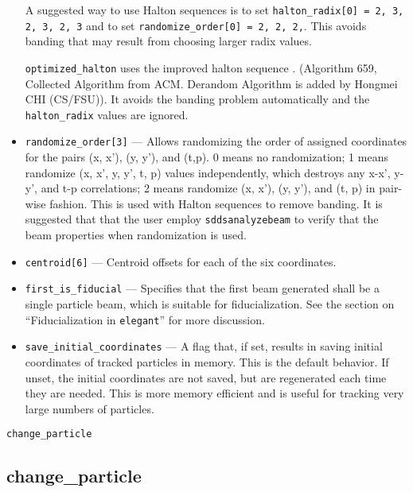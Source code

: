 \documentclass[11pt]{article}
\begin{document}
\begin{itemize}
A suggested way to use Halton sequences is to set
\verb|halton_radix[0] = 2, 3, 2, 3, 2, 3| and
to set 
\verb|randomize_order[0] = 2, 2, 2,|.  This avoids banding that may
result from choosing larger radix values.

\verb|optimized_halton| uses the improved halton sequence \cite{Chi2005}.
(Algorithm 659, Collected Algorithm from ACM. Derandom Algorithm is added
by Hongmei CHI (CS/FSU)). It avoids the banding problem automatically and
the \verb|halton_radix| values are ignored.

\item \verb|randomize_order[3]| --- Allows randomizing the order of
assigned coordinates for the pairs (x, x'), (y, y'), and (t,p).  0
means no randomization; 1 means randomize (x, x', y, y', t, p) values
independently, which destroys any x-x', y-y', and t-p correlations; 2
means randomize (x, x'), (y, y'), and (t, p) in pair-wise fashion.
This is used with Halton sequences to remove banding.  It is suggested
that that the user employ \verb|sddsanalyzebeam| to verify that the
beam properties when randomization is used.

\item \verb|centroid[6]| --- Centroid offsets for each of the six coordinates.

\item \verb|first_is_fiducial| --- Specifies that the first beam
generated shall be a single particle beam, which is suitable for
fiducialization.  See the section on ``Fiducialization in
\verb|elegant|'' for more discussion.

\item \verb|save_initial_coordinates| --- A flag that, if set, results
in saving initial coordinates of tracked particles in memory.  This is
the default behavior.  If unset, the initial coordinates are not
saved, but are regenerated each time they are needed.  This is more
memory efficient and is useful for tracking very large numbers of
particles.
\end{itemize}

\newpage
\begin{center}{\Large\verb|change_particle|}\end{center}
\subsection{change\_particle\label{subsec:changeparticle}}
\end{document}

